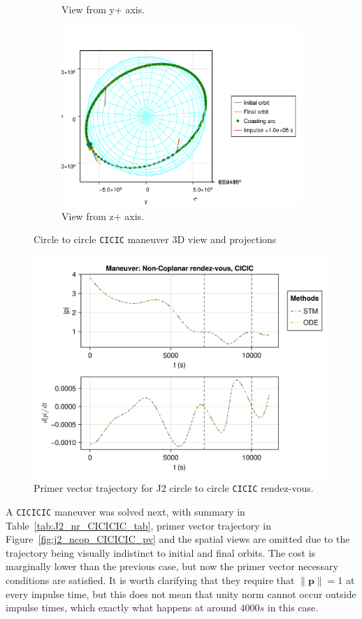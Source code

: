 \begin{figure}[htbp]
\begin{subfigure}{0.49\linewidth}
        \caption{View from y+ axis.}
    \end{subfigure}
    \begin{subfigure}{0.49\linewidth}
        \includegraphics[width=0.8\linewidth]{../results/j2/ipv_noncop/CICIC_z+.png}
        \caption{View from z+ axis.}
    \end{subfigure}
    \caption{Circle to circle \texttt{CICIC} maneuver 3D view and projections}
    \label{fig:j2_ncop_CICIC_figs}
\end{figure}

\begin{figure}[htbp]
    \centering
    \includegraphics[width=0.7\linewidth]{../results/j2/ipv_noncop/CICIC_primer_vector.png}
    \caption{Primer vector trajectory for J2 circle to circle \texttt{CICIC} rendez-vous.}
    \label{fig:j2_ncop_CICIC_pv}
\end{figure}
\FloatBarrier
A \texttt{CICICIC} maneuver was solved next, with summary in Table~\ref{tab:J2_nr_CICICIC_tab}, primer vector trajectory in Figure~\ref{fig:j2_ncop_CICICIC_pv} and the spatial views are omitted due to the trajectory being visually indistinct to initial and final orbits. The cost is marginally lower than the previous case, but now the primer vector necessary conditions are satisfied. It is worth clarifying that they require that \(\lVert \mathbf{p} \rVert = 1\) at every impulse time, but this does not mean that unity norm cannot occur outside impulse times, which exactly what happens at around \(4000 s\) in this case. 

